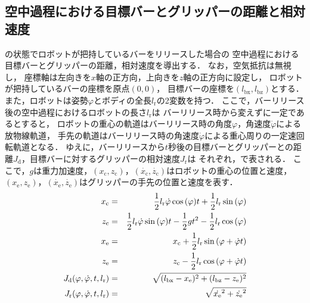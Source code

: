         \subsection{空中過程における目標バーとグリッパーの距離と相対速度}

          の状態でロボットが把持しているバーをリリースした場合の
          空中過程における目標バーとグリッパーの距離，相対速度を導出する．
          なお，空気抵抗は無視し，
          座標軸は左向きを$x$軸の正方向，上向きを$z$軸の正方向に設定し，
          ロボットが把持しているバーの座標を原点$(0,0)$，
          目標バーの座標を$(l_{\mathrm{bx}},l_{\mathrm{bz}})$とする．
          また，ロボットは姿勢$\varphi$とボディの全長$l_{\mathrm{r}}$の2変数を持つ．         
          ここで，バーリリース後の空中過程におけるロボットの長さ$l_{\mathrm{r}}$は
          バーリリース時から変えずに一定であるとすると， 
          ロボットの重心の軌道はバーリリース時の角度$\varphi$，角速度$\dot{\varphi}$による放物線軌道，
          手先の軌道はバーリリース時の角速度$\dot{\varphi}$による重心周りの一定速回転軌道となる．
          ゆえに，バーリリースから$t$秒後の目標バーとグリッパーとの距離$J_{\mathrm{d}}$，目標バーに対するグリッパーの相対速度$J_{\mathrm{r}}$は
          それぞれ，で表される．
          ここで，$g$は重力加速度，$(x_{\mathrm{c}},z_{\mathrm{c}})$，$(\dot{x_{\mathrm{c}}},\dot{z_{\mathrm{c}}})$はロボットの重心の位置と速度，
          $(x_{\mathrm{e}},z_{\mathrm{e}})$，$(\dot{x_{\mathrm{e}}},\dot{z_{\mathrm{e}}})$はグリッパーの手先の位置と速度を表す．
          \begin{eqnarray}
            \equlabel{x-c}
            x_{\mathrm{c}}&=&\frac{1}{2}l_{\mathrm{r}}\dot{\varphi}\cos{(\varphi)}t+\frac{1}{2}l_{\mathrm{r}}\sin{(\varphi)}\\
            \equlabel{z-c}
            z_{\mathrm{c}}&=&\frac{1}{2}l_{\mathrm{r}}\dot{\varphi}\sin{(\varphi)}t-\frac{1}{2}gt^2-\frac{1}{2}l_{\mathrm{r}}\cos{(\varphi)}\\
            \equlabel{x-e}
            x_{\mathrm{e}}&=&x_{\mathrm{c}}+\frac{1}{2}l_{\mathrm{r}}\sin{(\varphi+\dot{\varphi}t)}\\
            \equlabel{z-e}
            z_{\mathrm{e}}&=&z_{\mathrm{c}}-\frac{1}{2}l_{\mathrm{r}}\cos{(\varphi+\dot{\varphi}t)}\\
            \equlabel{Jd}
              J_{\mathrm{d}}(\varphi,\dot{\varphi},t,l_{\mathrm{r}})
              &=&\sqrt{(l_{\mathrm{bx}}-x_{\mathrm{e}})^2+(l_{\mathrm{bz}}-z_{\mathrm{e}})^2}\\
            \equlabel{Jr}
            J_{\mathrm{r}}(\varphi,\dot{\varphi},t,l_{\mathrm{r}})
            &=&\sqrt{\dot{x_{\mathrm{e}}}^2+\dot{z_{\mathrm{e}}}^2}
          \end{eqnarray}  
        
